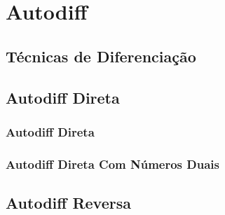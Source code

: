 \chapter{Autodiff}
\label{cap:autodiff}

\section{Técnicas de Diferenciação}

\section{Autodiff Direta}

\subsection{Autodiff Direta}

\subsection{Autodiff Direta Com Números Duais}

\section{Autodiff Reversa}